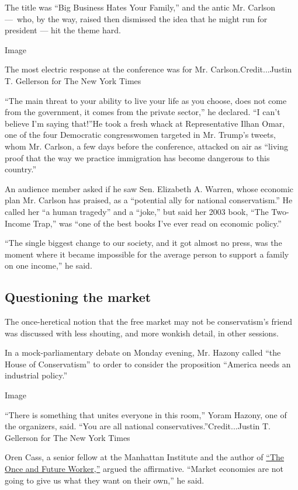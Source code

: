 The title was ``Big Business Hates Your Family,'' and the antic Mr.
Carlson ---~who, by the way, raised then dismissed the idea that he
might run for president --- hit the theme hard.

Image

The most electric response at the conference was for Mr.
Carlson.Credit...Justin T. Gellerson for The New York Times

``The main threat to your ability to live your life as you choose, does
not come from the government, it comes from the private sector,'' he
declared. ``I can't believe I'm saying that!''He took a fresh whack at
Representative Ilhan Omar, one of the four Democratic congresswomen
targeted in Mr. Trump's tweets, whom Mr. Carlson, a few days before the
conference, attacked on air as ``living proof that the way we practice
immigration has become dangerous to this country.''

An audience member asked if he saw Sen. Elizabeth A. Warren, whose
economic plan Mr. Carlson has praised, as a ``potential ally for
national conservatism.'' He called her ``a human tragedy'' and a
``joke,'' but said her 2003 book, ``The Two-Income Trap,'' was ``one of
the best books I've ever read on economic policy.''

``The single biggest change to our society, and it got almost no press,
was the moment where it became impossible for the average person to
support a family on one income,'' he said.

\hypertarget{questioning-the-market}{%
\subsection{Questioning the market}\label{questioning-the-market}}

The once-heretical notion that the free market may not be conservatism's
friend was discussed with less shouting, and more wonkish detail, in
other sessions.

In a mock-parliamentary debate on Monday evening, Mr. Hazony called
``the House of Conservatism'' to order to consider the proposition
``America needs an industrial policy.''

Image

``There is something that unites everyone in this room,'' Yoram Hazony,
one of the organizers, said. ``You are all national
conservatives.''Credit...Justin T. Gellerson for The New York Times

Oren Cass, a senior fellow at the Manhattan Institute and the author of
\href{https://www.manhattan-institute.org/theonceandfutureworker}{``The
Once and Future Worker,''} argued the affirmative. ``Market economies
are not going to give us what they want on their own,'' he said.

